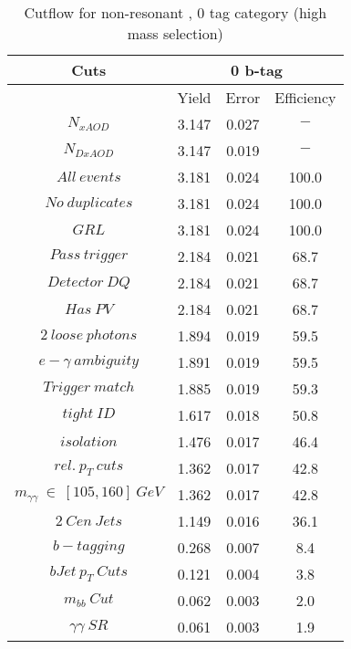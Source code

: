 \begin{table}\footnotesize
\begin{center}
\caption{Cutflow for non-resonant \hhyybb, 0 tag category (high mass selection)}
\label{tab:cutflow-nonres-0tag-high}
\begin{tabular}{|c|c|c|c|}
\hline
Cuts& \multicolumn{3}{c|}{0 b-tag} \\ \hline
&Yield&Error&Efficiency\\ \hline
$N_{xAOD}$ & 3.147&0.027 &$-$ \\
\hline
$N_{DxAOD}$ & 3.147&0.019 &$-$ \\
\hline
$All\ events$ & 3.181&0.024 &100.0 \\
\hline
$No\ duplicates$ & 3.181&0.024 &100.0 \\
\hline
$GRL$ & 3.181&0.024 &100.0 \\
\hline
$Pass\ trigger$ & 2.184&0.021 &68.7 \\
\hline
$Detector\ DQ$ & 2.184&0.021 &68.7 \\
\hline
$Has\ PV$ & 2.184&0.021 &68.7 \\
\hline
$2\ loose\ photons$ & 1.894&0.019 &59.5 \\
\hline
$e-\gamma\ ambiguity$ & 1.891&0.019 &59.5 \\
\hline
$Trigger\ match$ & 1.885&0.019 &59.3 \\
\hline
$tight\ ID$ & 1.617&0.018 &50.8 \\
\hline
$isolation$ & 1.476&0.017 &46.4 \\
\hline
$rel.\ p_{T}\ cuts$ & 1.362&0.017 &42.8 \\
\hline
$m_{\gamma\gamma}\ \in\ [105,160]\ GeV$ & 1.362&0.017 &42.8 \\
\hline
$2\ Cen\ Jets$ & 1.149&0.016 &36.1 \\
\hline
$b-tagging$ & 0.268&0.007 & 8.4 \\
\hline
$bJet\ p_{T}\ Cuts$ & 0.121&0.004 & 3.8 \\
\hline
$m_{bb}\ Cut$ & 0.062&0.003 & 2.0 \\
\hline
$\gamma\gamma\ SR$ & 0.061&0.003 & 1.9 \\
\hline
\end{tabular}
\end{center}
\end{table}
